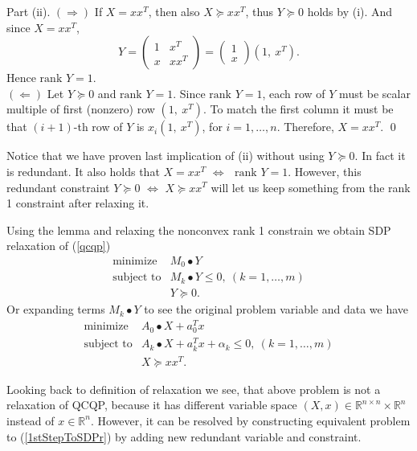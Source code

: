 \documentclass[10pt,oneside]{book}
\theoremstyle{definition}
\begin{document}
Part (ii). $(\Rightarrow)$ If $X=xx^T$, then also $X\succeq xx^T$, thus $Y\succeq 0$ holds by (i). And since $X=xx^T$,
$$Y=\left(
\begin{array}{cc}
1 & x^T\\
x & xx^T
\end{array}\right)
=  \left(\begin{array}{c}
1\\
x
\end{array}\right)
(1,\ x^T).
$$
Hence $\mbox{rank } Y=1$.\\
$(\Leftarrow)$ Let $Y\succeq 0$ and $\mbox{rank } Y=1$. Since $\mbox{rank } Y=1$, each row of $Y$ must be scalar multiple of first (nonzero) row $(1,\ x^T)$. To match the first column 
it must be that $(i+1)$-th row of $Y$ is $x_i(1,\ x^T)$, for $i=1,\dots , n$.
Therefore, $X=xx^T.$
\qed

\rem Notice that we have proven last implication of (ii) without using $Y\succeq 0$. In fact it is redundant. It also holds that $X=xx^T$ $\Leftrightarrow$ $\mbox{ rank } Y=1$. 
However, this redundant constraint $Y\succeq 0$ $\Leftrightarrow$ $X\succeq xx^T$ will let us keep something from the rank 1 constraint after relaxing it.

Using the lemma and relaxing the nonconvex rank 1 constrain we obtain SDP relaxation of (\ref{qcqp})
\begin{equation} 
\label{SDPrelax1}
\begin{array}{ll}
\mbox{minimize}& M_0\bullet Y \\
\mbox{subject to}& M_k\bullet Y \leq 0, \  (k = 1,\dots ,m)\\
& Y\succeq 0.
\end{array} 
\end{equation}
Or expanding terms $M_k\bullet Y$ to see the original problem variable and data we have
\begin{equation}
\label{SDPrelax2} 
\begin{array}{ll}
\mbox{minimize}& A_0\bullet X + a_0^Tx \\
\mbox{subject to}& A_k\bullet X+ a_k^Tx + \alpha_k \leq 0, \  (k = 1,\dots ,m)\\
& X\succeq xx^T.
\end{array} 
\end{equation}

Looking back to definition of relaxation we see, that above problem is not a relaxation of QCQP, because it has different variable space $(X,x)\in \mathbb{R}^{n\times n}\times \mathbb{R}^n$ instead of $x\in \mathbb{R}^n$. However, it can be resolved by constructing equivalent problem to (\ref{1stStepToSDPr}) by adding new redundant variable and constraint.
 
\end{document}
